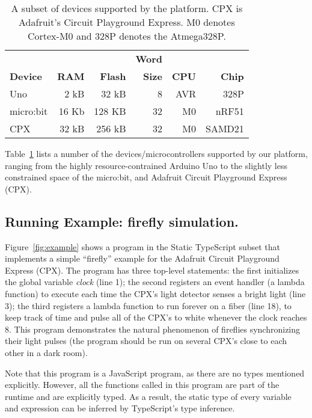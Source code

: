 \begin{table}[]
\centering
\begin{tabular}{|l|r|r|r|r|r|}
\hline
            &          &            & \bf{Word} &          &             \\
\bf{Device} & \bf{RAM} & \bf{Flash} & \bf{Size} & \bf{CPU} & \bf{Chip}   \\ \hline
Uno         & 2 kB     & 32 kB      & 8         & AVR      & 328P  \\ \hline
micro:bit   & 16 Kb    & 128 KB     & 32        & M0       & nRF51       \\ \hline
CPX         & 32 kB    & 256 kB     & 32        & M0       & SAMD21      \\ \hline
\end{tabular}
\caption{\label{table:devices}A subset of devices supported by the platform.
CPX is Adafruit's Circuit Playground Express. M0 denotes Cortex-M0 and 328P denotes
the Atmega328P.}
\end{table}

Table~\ref{table:devices} lists a number of the devices/microcontrollers supported by our platform, 
ranging from the highly resource-contrained Arduino Uno to the slightly less constrained space of
the micro:bit, and Adafruit Circuit Playground Express (CPX).

\subsection{Running Example: firefly simulation.}

Figure~\ref{fig:example} shows a program in the Static
TypeScript subset that implements a simple ``firefly'' example
for the Adafruit Circuit Playground Express (CPX).
The program has three top-level statements:
the first initializes the global variable \emph{clock} (line 1); the
second registers an event handler (a lambda function) to execute
each time the CPX's light detector senses a bright light (line 3); the
third registers a lambda function to run forever on a fiber (line 18),
to keep track of time and pulse all of the CPX's to white whenever the
clock reaches 8.  This program demonstrates the natural phenomenon
of fireflies synchronizing their light pulses (the program should be
run on several CPX's close to each other in a dark room).

Note that this program is a JavaScript program, as there are no
types mentioned explicitly. However, all the functions called in
this program are part of the runtime and are explicitly
typed.  As a result, the static type of every variable and expression
can be inferred by TypeScript's type inference.

